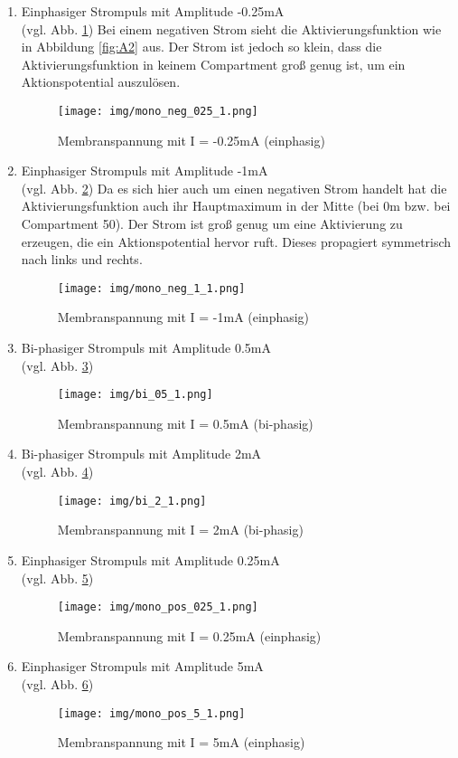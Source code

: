\documentclass[conference]{IEEEtran}
\begin{document}
\begin{enumerate}
\item Einphasiger Strompuls mit Amplitude -0.25mA\\ (vgl. Abb. \ref{fig:mono_neg_025_1}) Bei einem negativen Strom sieht die Aktivierungsfunktion wie in Abbildung \ref{fig:A2} aus. Der Strom ist jedoch so klein, dass die Aktivierungsfunktion in keinem Compartment groß genug ist, um ein Aktionspotential auszulösen.
\begin{figure}[h!]
	\centering
	\texttt{[image: img/mono\_neg\_025\_1.png]}
	\caption{Membranspannung mit I = -0.25mA (einphasig)}
	\label{fig:mono_neg_025_1}
\end{figure}

\item Einphasiger Strompuls mit Amplitude -1mA\\ (vgl. Abb. \ref{fig:mono_neg_1_1}) Da es sich hier auch um einen negativen Strom handelt hat die Aktivierungsfunktion auch ihr Hauptmaximum in der Mitte (bei 0\textmu m bzw. bei Compartment 50). Der Strom ist groß genug um eine Aktivierung zu erzeugen, die ein Aktionspotential hervor ruft. Dieses propagiert symmetrisch nach links und rechts.
\begin{figure}[h!]
	\centering
	\texttt{[image: img/mono\_neg\_1\_1.png]}
	\caption{Membranspannung mit I = -1mA (einphasig)}
	\label{fig:mono_neg_1_1}
\end{figure}

\item Bi-phasiger Strompuls mit Amplitude 0.5mA\\ (vgl. Abb. \ref{fig:bi_05_1})
\begin{figure}[h!]
	\centering
	\texttt{[image: img/bi\_05\_1.png]}
	\caption{Membranspannung mit I = 0.5mA (bi-phasig)}
	\label{fig:bi_05_1}
\end{figure}

\item Bi-phasiger Strompuls mit Amplitude 2mA\\ (vgl. Abb. \ref{fig:bi_2_1})
\begin{figure}[h!]
	\centering
	\texttt{[image: img/bi\_2\_1.png]}
	\caption{Membranspannung mit I = 2mA (bi-phasig)}
	\label{fig:bi_2_1}
\end{figure}

\item Einphasiger Strompuls mit Amplitude 0.25mA\\ (vgl. Abb. \ref{fig:mono_pos_025_1})
\begin{figure}[h!]
	\centering
	\texttt{[image: img/mono\_pos\_025\_1.png]}
	\caption{Membranspannung mit I = 0.25mA (einphasig)}
	\label{fig:mono_pos_025_1}
\end{figure}

\item Einphasiger Strompuls mit Amplitude 5mA\\ (vgl. Abb. \ref{fig:mono_pos_5_1})
\begin{figure}[h!]
	\centering
	\texttt{[image: img/mono\_pos\_5\_1.png]}
	\caption{Membranspannung mit I = 5mA (einphasig)}
	\label{fig:mono_pos_5_1}
\end{figure}

\end{enumerate}
\end{document}
